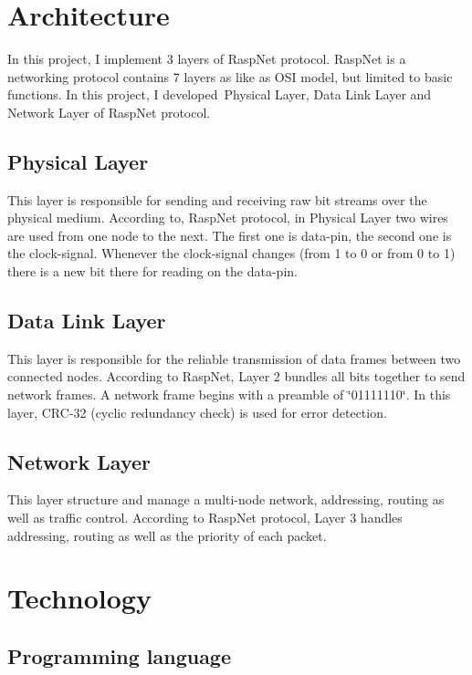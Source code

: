 \section*{Architecture }

In this project, I implement 3 layers of Rasp\+Net protocol. Rasp\+Net is a networking protocol contains 7 layers as like as O\+SI model, but limited to basic functions. In this project, I developed \+Physical Layer, Data Link Layer and Network Layer of Rasp\+Net protocol. \subsection*{Physical Layer}

This layer is responsible for sending and receiving raw bit streams over the physical medium. According to, Rasp\+Net protocol, in Physical Layer two wires are used from one node to the next. The first one is data-\/pin, the second one is the clock-\/signal. Whenever the clock-\/signal changes (from 1 to 0 or from 0 to 1) there is a new bit there for reading on the data-\/pin. \subsection*{Data Link Layer}

This layer is responsible for the reliable transmission of data frames between two connected nodes. According to Rasp\+Net, Layer 2 bundles all bits together to send network frames. A network frame begins with a preamble of \char`\"{}01111110\char`\"{}. In this layer, C\+R\+C-\/32 (cyclic redundancy check) is used for error detection. \subsection*{Network Layer}

This layer structure and manage a multi-\/node network, addressing, routing as well as traffic control. According to Rasp\+Net protocol, Layer 3 handles addressing, routing as well as the priority of each packet.\+ 

\section*{Technology }

\subsection*{Programming language}

